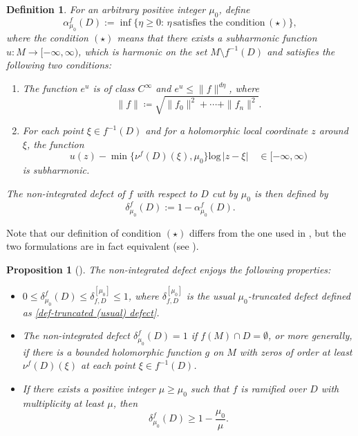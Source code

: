 \documentclass[english, 12pt]{amsart}
\def\log{\mathrm{log}\,}
\theoremstyle{plain}
\newtheorem{pro}[thm]{Proposition}
\newtheorem{defi}[thm]{Definition}
\theoremstyle{remark}
\numberwithin{equation}{section}
\theoremstyle{plain}
\theoremstyle{named}
\begin{document}
\begin{defi}\label{def:non-integrated defect}
	For an arbitrary positive integer $\mu_0$, define
	\[
	\alpha_{\mu_0} ^f(D)
	:=\inf\{\eta\geq 0:\,\eta\,\text{satisfies the condition}\,(\star)\},
	\]
	where the condition $(\star)$ means that there exists a subharmonic function $u\colon M\to [-\infty,\infty)$, which is harmonic on the set $M\setminus f^{-1}(D)$ and satisfies the following two conditions:
	\begin{enumerate}
		\item[(C1).] The function $e^u$ is of class $C^{\infty}$ and $e^u\leq \|f\|^{d\eta}$, where
		\[\|f\|\coloneq\sqrt{\|f_0\|^2+\cdots+\|f_n\|^2}.\] 
		\item[(C2).] For each point $\xi\in f^{-1}(D)$ and for a holomorphic local coordinate $z$ around $\xi$, the function
		\[
		u(z)-\min\{\nu^f(D)(\xi),\mu_0\}
		\log|z-\xi|\quad\in[-\infty,\infty)
		\]
		is subharmonic.
	\end{enumerate}
	The {\sl non-integrated defect} of $f$ with respect to $D$ cut by $\mu_0$ is then defined by
	\[
	\delta_{\mu_0}^f(D):=1-\alpha_{\mu_0} ^f(D).
	\]
\end{defi}
Note that our definition of condition $(\star)$  differs from the one used in \cite{Cai-Ru-Yang25}, but the two formulations are in fact equivalent (see \cite[p. 175]{Ru2023}).
\begin{pro}[\cite{Fujimoto83_1}]
	\label{properties of non-integrated defect}
	The {non-integrated defect} enjoys the following properties:
	\begin{itemize}
		\item[(1)]	$0\leq \delta_{\mu_0}^f(D)\leq \delta_{f,D}^{[\mu_0]}\leq 1$, where $\delta_{f,D}^{[\mu_0]}$ is the usual $\mu_0$-truncated defect  defined as \eqref{def-truncated (usual) defect}.
		\item[(2)] The {non-integrated defect} $\delta_{\mu_0}^f(D)=1$ if $f(M)\cap D=\emptyset$, or more generally, if there is a bounded holomorphic function $g$ on $M$ with zeros of order at least $\nu^f(D)(\xi)$ at each point $\xi\in f^{-1}(D)$.
		\item[(3)] If there exists a positive integer $\mu\geq\mu_0$ such that $f$ is ramified over $D$ with multiplicity at least $\mu$, then
		\begin{equation}\label{non-integrated vs ramification index}
			\delta_{\mu_0}^f(D)\geq 1-\dfrac{\mu_0}{\mu}.
		\end{equation}
	\end{itemize}
\end{pro}
\end{document}
